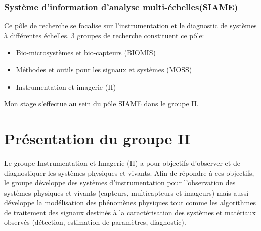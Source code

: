 \subsubsection{Système d'information d'analyse multi-échelles(SIAME)}
Ce pôle de recherche se focalise sur l'instrumentation et le diagnostic de systèmes à différentes échelles. 3 groupes de recherche constituent ce pôle:\\
\begin{itemize}
\item Bio-microsystèmes et bio-capteurs (BIOMIS)
\item Méthodes et outils pour les signaux et systèmes (MOSS)
\item Instrumentation et imagerie (II)
\end{itemize}
Mon stage s'effectue au sein du pôle SIAME dans le groupe II.
\section{Présentation du groupe II}
Le groupe Instrumentation et Imagerie (II) a pour objectifs d'observer et de diagnostiquer les systèmes physiques et vivants. Afin de répondre à ces objectifs, le groupe développe des systèmes d'instrumentation pour l'observation des systèmes physiques et vivants (capteurs, multicapteurs et imageurs) mais aussi développe la modélisation des phénomènes physiques tout comme les algorithmes de traitement des signaux destinés à la caractérisation des systèmes et matériaux observés (détection, estimation de paramètres, diagnostic).
